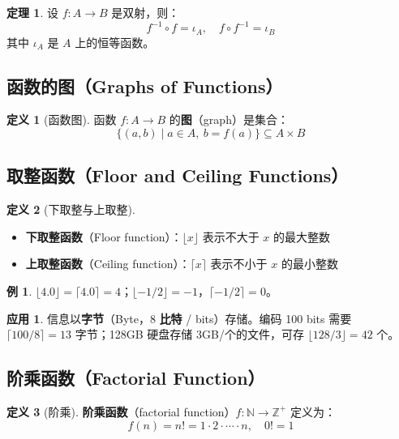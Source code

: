 \documentclass[UTF8,11pt,a4paper]{ctexbook}   %
\theoremstyle{definition}
\newtheorem{definition}{定义}[section]
\newtheorem{theorem}{定理}[section]
\newtheorem{example}{例}[section]
\newtheorem{application}{应用}[section]
\begin{document}
\begin{theorem}
设 $f: A \to B$ 是双射，则：
\[
f^{-1} \circ f = \iota_A, \quad f \circ f^{-1} = \iota_B
\]
其中 $\iota_A$ 是 $A$ 上的恒等函数。
\end{theorem}

\subsection{函数的图（Graphs of Functions）}

\begin{definition}[函数图]
函数 $f: A \to B$ 的\textbf{图}（graph）是集合：
\[
\{(a, b) \mid a \in A,\ b = f(a)\} \subseteq A \times B
\]
\end{definition}

\subsection{取整函数（Floor and Ceiling Functions）}

\begin{definition}[下取整与上取整]
\begin{itemize}
    \item \textbf{下取整函数}（Floor function）：$\lfloor x \rfloor$ 表示不大于 $x$ 的最大整数
    \item \textbf{上取整函数}（Ceiling function）：$\lceil x \rceil$ 表示不小于 $x$ 的最小整数
\end{itemize}
\end{definition}

\begin{example}
$\lfloor 4.0 \rfloor = \lceil 4.0 \rceil = 4$；$\lfloor -1/2 \rfloor = -1$，$\lceil -1/2 \rceil = 0$。
\end{example}

\begin{application}
信息以\textbf{字节}（Byte，8 \textbf{比特} / bits）存储。编码 100 bits 需要 $\lceil 100/8 \rceil = 13$ 字节；128GB 硬盘存储 3GB/个的文件，可存 $\lfloor 128/3 \rfloor = 42$ 个。
\end{application}

\subsection{阶乘函数（Factorial Function）}

\begin{definition}[阶乘]
\textbf{阶乘函数}（factorial function）$f: \mathbb{N} \to \mathbb{Z}^+$ 定义为：
\[
f(n) = n! = 1 \cdot 2 \cdot \cdots \cdot n, \quad 0! = 1
\]
\end{definition}
\end{document}
